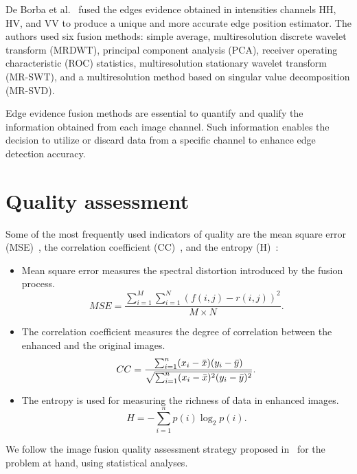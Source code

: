 \documentclass{article}
\begin{document}
De Borba et al.~\cite{DeBorba2020} fused the edges evidence obtained in intensities channels HH, HV, and VV to produce a unique and more accurate edge position estimator. 
The authors used six fusion methods: simple average, multiresolution discrete wavelet transform (MRDWT), principal component analysis (PCA), receiver operating characteristic (ROC) statistics, multiresolution stationary wavelet transform (MR-SWT), and a multiresolution method based on singular value decomposition (MR-SVD).

Edge evidence fusion methods are essential to quantify and qualify the information obtained from each image channel. 
Such information enables the decision to utilize or discard data from a specific channel to enhance edge detection accuracy.

\section{Quality assessment}

Some of the most frequently used indicators of quality are the mean square error (MSE)~\cite{beaulieu2003multi}, 
the correlation coefficient (CC)~\cite{aiazzi2004spectral}, and the entropy (H)~\cite{han2008study}:
\begin{itemize}
	\item Mean square error measures the spectral distortion introduced by the fusion process.
	$$MSE= \displaystyle \frac{\sum_{i=1}^{M}\sum_{i=1}^{N}(f(i,j)-r(i,j))^2}{M\times N}.$$
	\item The correlation coefficient measures the degree of correlation between the enhanced and the original images.
	$$CC=  \frac{\sum_{i=1}^{n}(x_i-\Bar{x})(y_i-\Bar{y})}{\sqrt{\sum_{i=1}^{n}(x_i-\Bar{x})^2(y_i-\Bar{y})^2}}.$$
	\item The entropy is used for measuring the richness of data in enhanced images.
	$$H=-\sum_{i=1}^{n}p(i)\log_2p(i).$$
\end{itemize}

We follow the image fusion quality assessment strategy proposed in~\cite{Li2010, Somvanshi2017,Nikola2015} for the problem at hand, using statistical analyses.


\end{document}
